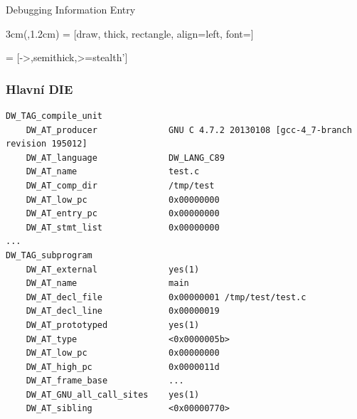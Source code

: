 \begin{frame}[fragile]{Debugging Information Entry}
  \begin{textblock*}{3cm}(\textwidth-3.5cm,1.2cm)
   = [draw, thick, rectangle, align=left, font=\footnotesize]
  \end{textblock*}


   = [->,semithick,>=stealth']

\end{frame}

\begin{frame}[fragile]
  \frametitle{Hlavní DIE}

\begin{lstlisting}
DW_TAG_compile_unit
    DW_AT_producer              GNU C 4.7.2 20130108 [gcc-4_7-branch revision 195012]
    DW_AT_language              DW_LANG_C89
    DW_AT_name                  test.c
    DW_AT_comp_dir              /tmp/test
    DW_AT_low_pc                0x00000000
    DW_AT_entry_pc              0x00000000
    DW_AT_stmt_list             0x00000000
...
DW_TAG_subprogram
    DW_AT_external              yes(1)
    DW_AT_name                  main
    DW_AT_decl_file             0x00000001 /tmp/test/test.c
    DW_AT_decl_line             0x00000019
    DW_AT_prototyped            yes(1)
    DW_AT_type                  <0x0000005b>
    DW_AT_low_pc                0x00000000
    DW_AT_high_pc               0x0000011d
    DW_AT_frame_base            ...
    DW_AT_GNU_all_call_sites    yes(1)
    DW_AT_sibling               <0x00000770>
\end{lstlisting}

\end{frame}

